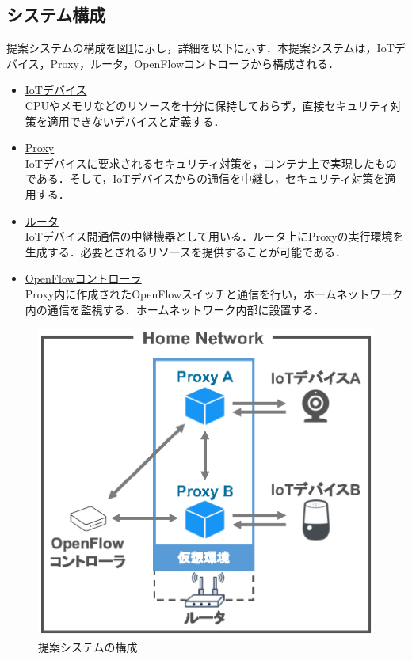 \documentclass[a4paper,10pt,twocolumn,uplatex]{jsarticle}
\begin{document}
\subsection{システム構成}
提案システムの構成を図\ref{fig:system}に示し，詳細を以下に示す．本提案システムは，IoTデバイス，Proxy，ルータ，OpenFlowコントローラから構成される．
\begin{itemize}
  \item \underline{IoTデバイス}\mbox{}\\
        CPUやメモリなどのリソースを十分に保持しておらず，直接セキュリティ対策を適用できないデバイスと定義する．
  \item \underline{Proxy}\mbox{}\\
        IoTデバイスに要求されるセキュリティ対策を，コンテナ上で実現したものである．そして，IoTデバイスからの通信を中継し，セキュリティ対策を適用する．
  \item \underline{ルータ}\mbox{}\\
        IoTデバイス間通信の中継機器として用いる．ルータ上にProxyの実行環境を生成する．必要とされるリソースを提供することが可能である．
  \item \underline{OpenFlowコントローラ}\mbox{}\\
        Proxy内に作成されたOpenFlowスイッチと通信を行い，ホームネットワーク内の通信を監視する．ホームネットワーク内部に設置する．
\end{itemize}

\begin{figure}[!tb]
  \centering
  \includegraphics[width=\linewidth]{img/system.eps}
  \caption{提案システムの構成}
  \label{fig:system}
\end{figure}
\end{document}
